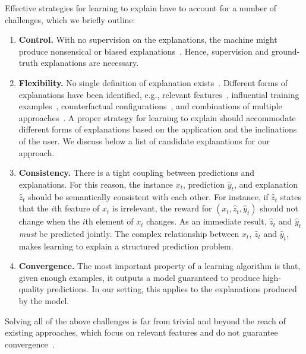 \documentclass[letterpaper]{article} %
\begin{document}
Effective strategies for learning to explain have to account for a number of challenges, which we briefly outline:
%
\begin{enumerate}%
    \item \textbf{Control.} With no supervision on the explanations, the machine might produce nonsensical or biased explanations~\cite{lapuschkin2019unmasking,ross2017right,schramowski2020right}. Hence, supervision and ground-truth explanations are necessary.

    \item \textbf{Flexibility.} No single definition of explanation exists~\cite{miller2018explanation,guidotti2018survey}.
    Different forms of explanations have been identified, e.g., relevant features~\cite{ribeiro2016should}, influential training examples~\cite{koh2017understanding}, counterfactual configurations~\cite{guidotti2018local}, and combinations of multiple approaches~\cite{bogaerts2020step}.  A proper strategy for learning to explain should accommodate different forms of explanations based on the application and  the inclinations of the user. We discuss below a list of candidate explanations for our approach.

    \item \textbf{Consistency.}  There is a tight coupling between predictions and explanations.  For this reason, the instance $x_t$, prediction $\hat{y}_t$, and explanation $\hat{z}_t$ should be semantically consistent with each other.  For instance, if $\hat{z}_t$ states that the $i$th feature of $x_t$ is irrelevant, the reward for $(x_t, \hat{z}_t, \hat{y}_t)$ should not change when the $i$th element of $x_t$ changes. As an immediate result,  $\hat{z}_t$ and $\hat{y}_t$ \emph{must} be predicted jointly.  The complex relationship between $x_t$, $\hat{z}_t$ and $\hat{y}_t$,  makes learning to explain a structured prediction problem.

    \item \textbf{Convergence.}  The most important property of a learning algorithm is that, given enough examples, it outputs a model guaranteed to produce high-quality predictions.  In our setting, this applies to the explanations produced by the model.

\end{enumerate}
%
Solving all of the above challenges is far from trivial and beyond the reach of existing approaches, which focus on relevant features and do not guarantee convergence~\cite{schramowski2020right,lertvittayakumjorn2020find}.
\end{document}

